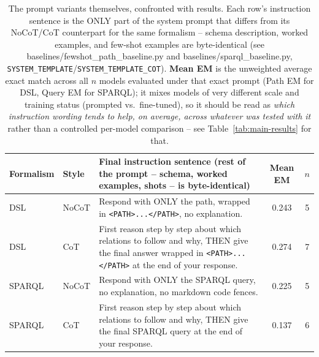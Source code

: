 \begin{table}[t]
\centering
\small
\begin{tabular}{l l p{7.2cm} c c}
\toprule
\textbf{Formalism} & \textbf{Style} & \textbf{Final instruction sentence (rest of the prompt -- schema, worked examples, shots -- is byte-identical)} & \textbf{Mean EM} & $n$ \\
\midrule
DSL & NoCoT & Respond with ONLY the path, wrapped in \texttt{<PATH>...</PATH>}, no explanation. & 0.243 & 5 \\
DSL & CoT & First reason step by step about which relations to follow and why, THEN give the final answer wrapped in \texttt{<PATH>...</PATH>} at the end of your response. & 0.274 & 7 \\
SPARQL & NoCoT & Respond with ONLY the SPARQL query, no explanation, no markdown code fences. & 0.225 & 5 \\
SPARQL & CoT & First reason step by step about which relations to follow and why, THEN give the final SPARQL query at the end of your response. & 0.137 & 6 \\
\bottomrule
\end{tabular}
\caption{The prompt variants themselves, confronted with results. Each row's instruction sentence is the ONLY part of the system prompt that differs from its NoCoT/CoT counterpart for the same formalism -- schema description, worked examples, and few-shot examples are byte-identical (see baselines/fewshot\_path\_baseline.py and baselines/sparql\_baseline.py, \texttt{SYSTEM\_TEMPLATE}/\texttt{SYSTEM\_TEMPLATE\_COT}). \textbf{Mean EM} is the unweighted average exact match across all $n$ models evaluated under that exact prompt (Path EM for DSL, Query EM for SPARQL); it mixes models of very different scale and training status (prompted vs.\ fine-tuned), so it should be read as \emph{which instruction wording tends to help, on average, across whatever was tested with it} rather than a controlled per-model comparison -- see Table~\ref{tab:main-results} for that.}
\label{tab:prompt-variants}
\end{table}
